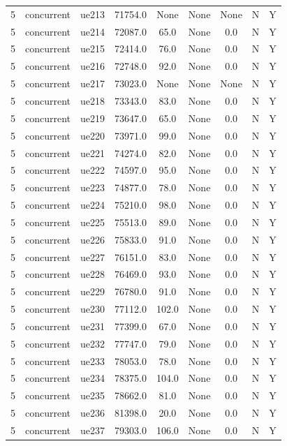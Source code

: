 \begin{table}[ht]
\begin{tabular}{|c|c|c|c|c|c|c|c|c|}
5 & concurrent & ue213 & 71754.0 & None & None & None & N & Y \\
5 & concurrent & ue214 & 72087.0 & 65.0 & None & 0.0 & N & Y \\
5 & concurrent & ue215 & 72414.0 & 76.0 & None & 0.0 & N & Y \\
5 & concurrent & ue216 & 72748.0 & 92.0 & None & 0.0 & N & Y \\
5 & concurrent & ue217 & 73023.0 & None & None & None & N & Y \\
5 & concurrent & ue218 & 73343.0 & 83.0 & None & 0.0 & N & Y \\
5 & concurrent & ue219 & 73647.0 & 65.0 & None & 0.0 & N & Y \\
5 & concurrent & ue220 & 73971.0 & 99.0 & None & 0.0 & N & Y \\
5 & concurrent & ue221 & 74274.0 & 82.0 & None & 0.0 & N & Y \\
5 & concurrent & ue222 & 74597.0 & 95.0 & None & 0.0 & N & Y \\
5 & concurrent & ue223 & 74877.0 & 78.0 & None & 0.0 & N & Y \\
5 & concurrent & ue224 & 75210.0 & 98.0 & None & 0.0 & N & Y \\
5 & concurrent & ue225 & 75513.0 & 89.0 & None & 0.0 & N & Y \\
5 & concurrent & ue226 & 75833.0 & 91.0 & None & 0.0 & N & Y \\
5 & concurrent & ue227 & 76151.0 & 83.0 & None & 0.0 & N & Y \\
5 & concurrent & ue228 & 76469.0 & 93.0 & None & 0.0 & N & Y \\
5 & concurrent & ue229 & 76780.0 & 91.0 & None & 0.0 & N & Y \\
5 & concurrent & ue230 & 77112.0 & 102.0 & None & 0.0 & N & Y \\
5 & concurrent & ue231 & 77399.0 & 67.0 & None & 0.0 & N & Y \\
5 & concurrent & ue232 & 77747.0 & 79.0 & None & 0.0 & N & Y \\
5 & concurrent & ue233 & 78053.0 & 78.0 & None & 0.0 & N & Y \\
5 & concurrent & ue234 & 78375.0 & 104.0 & None & 0.0 & N & Y \\
5 & concurrent & ue235 & 78662.0 & 81.0 & None & 0.0 & N & Y \\
5 & concurrent & ue236 & 81398.0 & 20.0 & None & 0.0 & N & Y \\
5 & concurrent & ue237 & 79303.0 & 106.0 & None & 0.0 & N & Y \\

\end{tabular}
\end{table}
